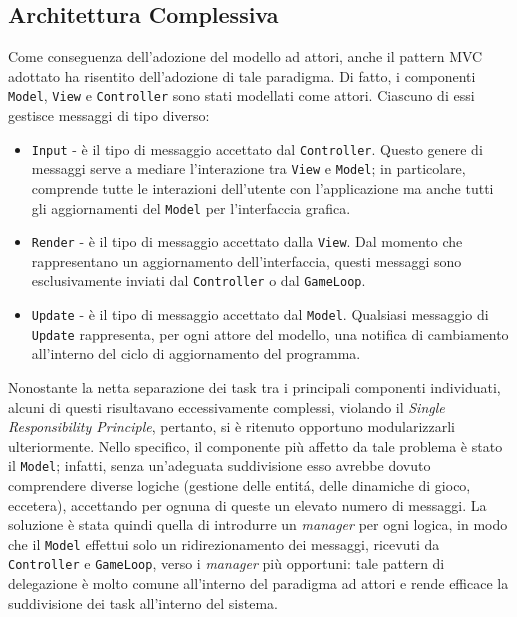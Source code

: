 \subsection{Architettura Complessiva}
Come conseguenza dell'adozione del modello ad attori, anche il pattern MVC adottato ha risentito dell'adozione di tale
paradigma. Di fatto, i componenti \texttt{Model}, \texttt{View} e \texttt{Controller} sono stati modellati come attori.
Ciascuno di essi gestisce messaggi di tipo diverso:
\begin{itemize}
    \item \texttt{Input} - è il tipo di messaggio accettato dal \texttt{Controller}. Questo genere di messaggi serve a mediare l'interazione tra \texttt{View} e \texttt{Model}; in particolare, comprende tutte le interazioni dell'utente con l'applicazione ma anche tutti gli aggiornamenti del \texttt{Model} per l'interfaccia grafica.
    \item \texttt{Render} - è il tipo di messaggio accettato dalla \texttt{View}. Dal momento che rappresentano un aggiornamento dell'interfaccia, questi messaggi sono esclusivamente inviati dal \texttt{Controller} o dal \texttt{GameLoop}.
    \item \texttt{Update} - è il tipo di messaggio accettato dal \texttt{Model}. Qualsiasi messaggio di \texttt{Update} rappresenta, per ogni attore del modello, una notifica di cambiamento all'interno del ciclo di aggiornamento del programma.
\end{itemize}
Nonostante la netta separazione dei task tra i principali componenti individuati, alcuni di questi risultavano
eccessivamente complessi, violando il \textit{Single Responsibility Principle}, pertanto, si è ritenuto opportuno
modularizzarli ulteriormente. Nello specifico, il componente più affetto da tale problema è stato il \texttt{Model};
infatti, senza un'adeguata suddivisione esso avrebbe dovuto comprendere diverse logiche (gestione delle entitá, delle
dinamiche di gioco, eccetera), accettando per ognuna di queste un elevato numero di messaggi. La soluzione è stata
quindi quella di introdurre un \textit{manager} per ogni logica, in modo che il \texttt{Model} effettui solo un
ridirezionamento dei messaggi, ricevuti da \texttt{Controller} e \texttt{GameLoop}, verso i \textit{manager} più
opportuni: tale pattern di delegazione è molto comune all'interno del paradigma ad attori e rende efficace la
suddivisione dei task all'interno del sistema.

